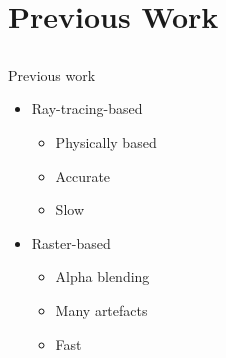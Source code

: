 \documentclass{beamer}
\begin{document}
\section{Previous Work}
\subsection{}

\begin{frame}{Previous work}

\begin{multicols}{2}

\begin{itemize}
\setlength\itemsep{0.5em}
\item Ray-tracing-based
		\vspace{0.2cm}
		\begin{itemize}
		\setlength\itemsep{0.5em}
		\item Physically based 
		\item Accurate
		\item Slow
		\end{itemize}
\end{itemize}
	
\begin{itemize}
\setlength\itemsep{0.5em}	
\item Raster-based
		\begin{itemize}
		\vspace{0.2cm}
		\setlength\itemsep{0.5em}
		\item Alpha blending
		\item Many artefacts
		\item Fast
		\end{itemize}
\end{itemize}


\end{multicols}


\end{frame}
\end{document}

